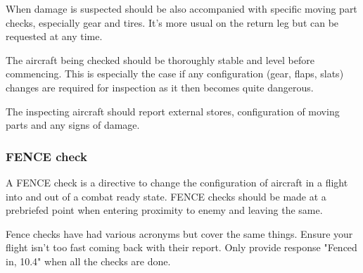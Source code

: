 When damage is suspected should be also accompanied with specific moving part
checks, especially gear and tires. It's more usual on the return leg but can be
requested at any time.

The aircraft being checked should be thoroughly stable and level before
commencing. This is especially the case if any configuration (gear, flaps,
slats) changes are required for inspection as it then becomes quite dangerous.

The inspecting aircraft should report external stores, configuration of moving
parts and any signs of damage.

\newpage

\subsubsection{FENCE check}

A FENCE check is a directive to change the configuration of aircraft in a
flight into and out of a combat ready state. FENCE checks should be made at a
prebriefed point when entering proximity to enemy and leaving the same.

Fence checks have had various acronyms but cover the same things. Ensure your
flight isn't too fast coming back with their report. Only provide response
"Fenced in, 10.4" when all the checks are done.

